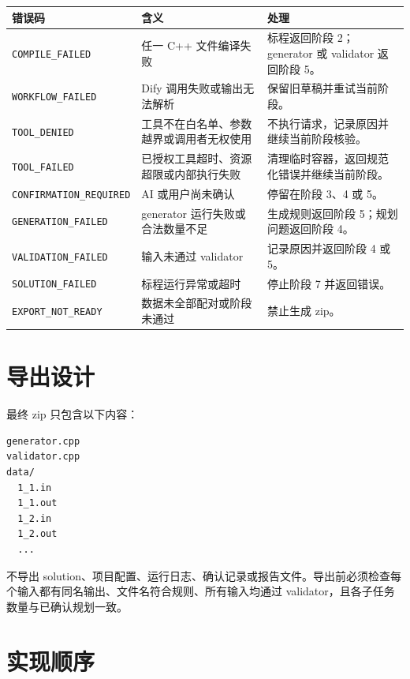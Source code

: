 \documentclass[UTF8,zihao=-4]{ctexart}
\begin{document}
\begin{longtable}{p{4.5cm}p{5.8cm}p{3.7cm}}
\toprule
错误码 & 含义 & 处理 \\
\midrule
\texttt{COMPILE\_FAILED} & 任一 C++ 文件编译失败 & 标程返回阶段 2；generator 或 validator 返回阶段 5。 \\
\texttt{WORKFLOW\_FAILED} & Dify 调用失败或输出无法解析 & 保留旧草稿并重试当前阶段。 \\
\texttt{TOOL\_DENIED} & 工具不在白名单、参数越界或调用者无权使用 & 不执行请求，记录原因并继续当前阶段核验。 \\
\texttt{TOOL\_FAILED} & 已授权工具超时、资源超限或内部执行失败 & 清理临时容器，返回规范化错误并继续当前阶段。 \\
\footnotesize\texttt{CONFIRMATION\_REQUIRED} & AI 或用户尚未确认 & 停留在阶段 3、4 或 5。 \\
\texttt{GENERATION\_FAILED} & generator 运行失败或合法数量不足 & 生成规则返回阶段 5；规划问题返回阶段 4。 \\
\texttt{VALIDATION\_FAILED} & 输入未通过 validator & 记录原因并返回阶段 4 或 5。 \\
\texttt{SOLUTION\_FAILED} & 标程运行异常或超时 & 停止阶段 7 并返回错误。 \\
\texttt{EXPORT\_NOT\_READY} & 数据未全部配对或阶段未通过 & 禁止生成 zip。 \\
\bottomrule
\end{longtable}

\section{导出设计}

最终 zip 只包含以下内容：

\begin{lstlisting}
generator.cpp
validator.cpp
data/
  1_1.in
  1_1.out
  1_2.in
  1_2.out
  ...
\end{lstlisting}

不导出 solution、项目配置、运行日志、确认记录或报告文件。导出前必须检查每个输入都有同名输出、文件名符合规则、所有输入均通过 validator，且各子任务数量与已确认规划一致。

\section{实现顺序}
\end{document}
